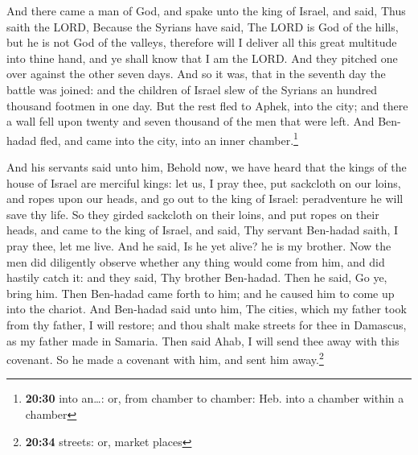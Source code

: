  And there came a man of God, and spake unto the king of
Israel, and said, Thus saith the LORD, Because the Syrians have said,
The LORD is God of the hills, but he is not God of the valleys,
therefore will I deliver all this great multitude into thine hand, and
ye shall know that I am the LORD.  And they pitched one
over against the other seven days. And so it was, that in the seventh
day the battle was joined: and the children of Israel slew of the
Syrians an hundred thousand footmen in one day.  But the
rest fled to Aphek, into the city; and there a wall fell upon twenty and
seven thousand of the men that were left. And Ben-hadad fled, and came
into the city, into an inner chamber.\footnote{\textbf{20:30} into
  an\ldots: or, from chamber to chamber: Heb. into a chamber within a
  chamber}

 And his servants said unto him, Behold now, we have
heard that the kings of the house of Israel are merciful kings: let us,
I pray thee, put sackcloth on our loins, and ropes upon our heads, and
go out to the king of Israel: peradventure he will save thy life.
 So they girded sackcloth on their loins, and put ropes
on their heads, and came to the king of Israel, and said, Thy servant
Ben-hadad saith, I pray thee, let me live. And he said, Is he yet alive?
he is my brother.  Now the men did diligently observe
whether any thing would come from him, and did hastily catch it: and
they said, Thy brother Ben-hadad. Then he said, Go ye, bring him. Then
Ben-hadad came forth to him; and he caused him to come up into the
chariot.  And Ben-hadad said unto him, The cities, which
my father took from thy father, I will restore; and thou shalt make
streets for thee in Damascus, as my father made in Samaria. Then said
Ahab, I will send thee away with this covenant. So he made a covenant
with him, and sent him away.\footnote{\textbf{20:34} streets: or, market
  places}

